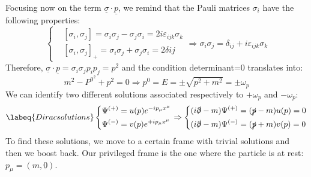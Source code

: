 \documentclass[../main.tex]{subfiles}
\begin{document}
Focusing now on the term $\underline{\sigma}\cdot\underline{p}$, we remind that the Pauli matrices $\sigma_i$ have the following properties:
\[
\left\{
\begin{aligned}
&[\sigma_i,\sigma_j]=\sigma_i\sigma_j-\sigma_j\sigma_i=2i\varepsilon_{ijk}\sigma_k\\
&[\sigma_i,\sigma_j]_+=\sigma_i\sigma_j+\sigma_j\sigma_i=2\delta{ij}
\end{aligned}
\right.
\Rightarrow \sigma_i\sigma_j=\delta_{ij}+i\varepsilon_{ijk}\sigma_k
\]
Therefore, $\underline{\sigma}\cdot\underline{p}=\sigma_i\sigma_jp_ip_j=p^2$ and the condition determinant=0 translates into:
\[
m^2-P^{0^2}+p^2=0\Rightarrow p^0=E=\pm\sqrt{p^2+m^2}=\pm\omega_p
\]
We can identify two different solutions associated respectively to $+\omega_p$ and $-\omega_p$:
\begin{equation}
\labeq{Diracsolutions}
\left\{
\begin{aligned}
\Psi^{(+)}&=u(p)e^{-ip_\mu x^\mu}\\
\Psi^{(-)}&=v(p)e^{+ip_\mu x^\mu}
\end{aligned}
\right.
\Rightarrow
\left\{
\begin{aligned}
&(i\slashed{\partial}-m)\Psi^{(+)}=(\slashed{p}-m)u(p)=0\\
&(i\slashed{\partial}-m)\Psi^{(-)}=(\slashed{p}+m)v(p)=0
\end{aligned}
\right.
\end{equation}
To find these solutions, we move to a certain frame with trivial solutions and then we boost back. Our privileged frame is the one where the particle is at rest: $p_\mu=(m,\underline{0})$.
\end{document}
